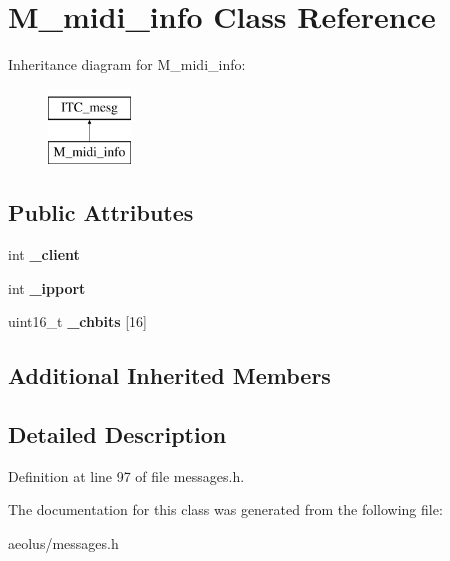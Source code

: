 \hypertarget{class_m__midi__info}{}\section{M\+\_\+midi\+\_\+info Class Reference}
\label{class_m__midi__info}
Inheritance diagram for M\+\_\+midi\+\_\+info\+:\begin{figure}[H]
\begin{center}
\leavevmode
\includegraphics[height=2.000000cm]{class_m__midi__info}
\end{center}
\end{figure}
\subsection*{Public Attributes}
\begin{DoxyCompactItemize}
\item 
\mbox{\label{class_m__midi__info_aa42c2e00aa98b7c5f6c63bde1f8193ba}} 
int {\bfseries \+\_\+client}
\item 
\mbox{\label{class_m__midi__info_a6cbe758698ffbe1dee49c8f8755c2728}} 
int {\bfseries \+\_\+ipport}
\item 
\mbox{\label{class_m__midi__info_a6fcb1c88e181428da8af1f6c4ab17c21}} 
uint16\+\_\+t {\bfseries \+\_\+chbits} \mbox{[}16\mbox{]}
\end{DoxyCompactItemize}
\subsection*{Additional Inherited Members}


\subsection{Detailed Description}


Definition at line 97 of file messages.\+h.



The documentation for this class was generated from the following file\+:\begin{DoxyCompactItemize}
\item 
aeolus/messages.\+h\end{DoxyCompactItemize}
